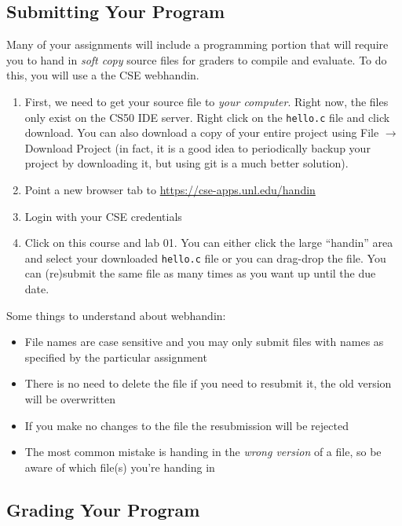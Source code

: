 \documentclass[12pt]{scrartcl}
\begin{document}
\subsection{Submitting Your Program}

Many of your assignments will include a programming portion that will 
require you to hand in \emph{soft copy} source files for graders to compile 
and evaluate.  To do this, you will use a the CSE webhandin.

\begin{enumerate}
  \item First, we need to get your source file to \emph{your computer}.
  Right now, the files only exist on the CS50 IDE server.  Right click
  on the \texttt{hello.c} file and click download.  You
  can also download a copy of your entire project using File $\rightarrow$
  Download Project (in fact, it is a good idea to periodically backup
  your project by downloading it, but using git is a much better solution).
  \item Point a new browser tab to \url{https://cse-apps.unl.edu/handin}
  \item Login with your CSE credentials
  \item Click on this course and lab 01.  You can either click the 
  large ``handin'' area and select your downloaded \texttt{hello.c} 
  file or you can drag-drop the file.  You can (re)submit the same file as
  many times as you want up until the due date.  
\end{enumerate}

Some things to understand about webhandin:
\begin{itemize}
  \item File names are case sensitive and you may only submit files
  with names as specified by the particular assignment
  \item There is no need to delete the file if you need to resubmit 
  it, the old version will be overwritten
  \item If you make no changes to the file the resubmission will be rejected
  \item The most common mistake is handing in the \emph{wrong version}
  of a file, so be aware of which file(s) you're handing in
\end{itemize}

\subsection{Grading Your Program}
\end{document}
